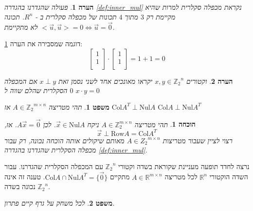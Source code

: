 \documentclass[12pt,leqno]{article}
\theoremstyle{theoremdd}
\newtheorem{theorem}{משפט}[section]
\newtheorem{comm}{הערה}[section]
\newtheorem*{prove}{הוכחה}
\newcommand{\Zn}{{\mathbb{Z}_2}^n}
\newcommand{\Col}{\mathrm{Col}}
\newcommand{\Nul}{\mathrm{Nul}}
\begin{document}
\begin{comm}
    \label{comm:not_really_inner_mul}
    פעולה שהגדרנו 
    בהגדרה 
    \ref{def:inner_mul}
    נקראת 
    מכפלה סקלרית
    למרות שהיא
    מקיימת רק 
    $3$
    מתוך 
    $4$
    תכונות של מכפלה סקלרית ב
    -
    $R^n$.   
    תכונה 
    $<\vec{u},\vec{u}> = 0 \Leftrightarrow \vec{u} = \vec{0} $
    לא מתקיימת.
\end{comm}
דוגמה 
שמסבירה את הערה
\ref{comm:not_really_inner_mul}:
\[
    \begin{bmatrix}
    1 \\
    1 \\
    \end{bmatrix}    
    \cdot 
    \begin{bmatrix}
    1 \\
    1 \\
    \end{bmatrix} 
    = 1 + 1 = 0
\]
\begin{comm}
    וקטורים 
    $x, y \in \Zn $
    יקראו מאונכים אחד לשני נסמן זאת 
    $x \perp  y$
    אם המכפלה הסקלרית שהלם שווה 
    ל
    $0$
    $x \cdot y = 0$
\end{comm}
\begin{theorem}
    \label{the: Nul A and Col AT}
    תהי מטריצה 
    $A \in {\mathbb{Z}_2}^{m \times n }$
    אז 
    $\Col A^T \perp \Nul A$
    $\Col A \perp \Nul A^T$
\end{theorem}
\begin{prove}
    תהי 
    מטריצה
    $A \in \mathbb{Z}_2^{m \times n}$
    ניקח 
    $\vec x \in \mathrm{Nul} A$.
    לכן
    $A\vec x=\vec 0$. 
    אז,
    \[
        \vec x \perp \mathrm{Row}A=\mathrm{Col} A^T
    \]
    רצוי לציין 
    שעבור 
    מטריצות 
    $A \in {Z_2}^{m \times n}$
    מאותם שיקולים אותה הוכחה נכונה,
    רק עבור מכפלה הסקלרית שהגדרנו 
    בהגדרה 
    \ref{def:inner_mul}.
\end{prove}
נרצה לחדד תופעה מעניינת שקוראת בשדה וקטורי 
$\Zn$
עם המכפלה הסקלרית שהגדרנו.
עבור השדה הוקטורי 
$\mathbb{R}^n$
לכל מטריצה 
$A \in \mathbb{R}^{m \times n}$
מתקיים 
$\Col A \cap \Nul A^T = \{ \vec{0}\}$.
טענה זה אינה נכונה בשדה 
$\Zn$.
\begin{theorem}
    \label{thrm: clean game has solution}
    לכל משחק על גרף קיים פתרון.
\end{theorem}
\end{document}
